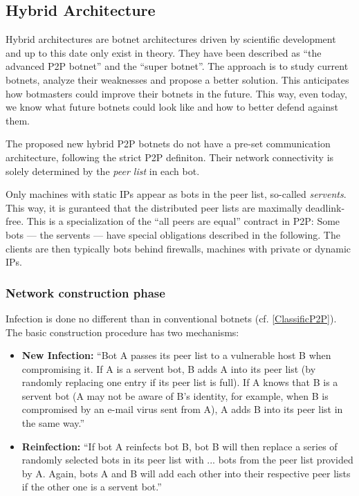 \documentclass{llncs}
\begin{document}
\subsection{Hybrid Architecture}
\label{hybrid}
Hybrid architectures are botnet architectures driven by scientific
development and up to this date only exist in theory. They have been
described as ``the advanced P2P botnet''\cite{td1sc} and the ``super
botnet''\cite{vogt2007army}. The approach is to study current botnets,
analyze their weaknesses and propose a better solution. This
anticipates how botmasters could improve their botnets in the
future. This way, even today, we know what future botnets could look
like and how to better defend against them.

The proposed new hybrid P2P botnets do not have a pre-set
communication architecture, following the strict P2P definiton. Their
network connectivity is solely determined by the {\it peer list} in
each bot.

Only machines with static IPs appear as bots in the peer list,
so-called {\it servents}.\cite{td1sc} This way, it is guranteed that
the distributed peer lists are maximally deadlink-free.  This is a
specialization of the ``all peers are equal'' contract in P2P: Some
bots --- the servents --- have special obligations described in the
following.  The clients are then typically bots behind firewalls,
machines with private or dynamic IPs.

\subsubsection{Network construction phase}

Infection is done no different than in conventional botnets
(cf. \ref{ClassificP2P}). The basic construction procedure has two
mechanisms:
\begin{itemize}
\item {\bf New Infection:} ``Bot A passes its peer list to a
vulnerable host B when compromising it. If A is a
servent bot, B adds A into its peer list (by randomly
replacing one entry if its peer list is full). If A knows
that B is a servent bot (A may not be aware of
B’s identity, for example, when B is compromised by
an e-mail virus sent from A), A adds B into its peer
list in the same way.'' \cite{td1sc}
\item {\bf Reinfection:} ``If bot A
reinfects bot B, bot B will then replace \lbrack{}a series of\rbrack{} 
 randomly selected bots in its peer list with \lbrack{}...\rbrack{} bots
from the peer list provided by A. Again, bots A and B
will add each other into their respective peer lists if
the other one is a servent bot.''\cite{td1sc}
\end{itemize}
\end{document}
